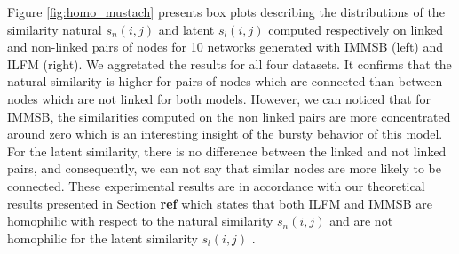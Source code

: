 Figure \ref{fig:homo_mustach} presents box plots describing  the distributions of the similarity natural $s_n(i,j)$ and latent $s_l(i,j)$ computed respectively on linked and non-linked pairs of nodes for 10 networks generated with IMMSB (left) and ILFM (right). We aggretated the results for all four datasets.  It confirms that the natural similarity is  higher for  pairs of nodes which are connected than between nodes which are not linked for both models. However, we can noticed that for IMMSB, the similarities computed on the non linked pairs are more concentrated around zero which is an interesting insight of the bursty behavior of this model. For the latent similarity,  there is no difference between the linked and not linked pairs, and consequently, we can not say that similar nodes are more likely to be connected. These experimental results are in accordance with our theoretical results presented in Section \textbf{ref} which states that both ILFM and IMMSB are homophilic with respect to the natural similarity $s_n(i,j)$ and are not homophilic for the latent similarity $s_l(i,j)$ .

